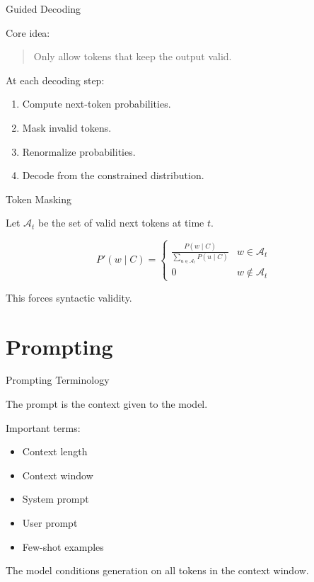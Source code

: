 \documentclass[aspectratio=169]{beamer}
\begin{document}
\begin{frame}{Guided Decoding}

Core idea:

\begin{quote}
Only allow tokens that keep the output valid.
\end{quote}

\vspace{0.4cm}

At each decoding step:

\begin{enumerate}
    \item Compute next-token probabilities.
    \item Mask invalid tokens.
    \item Renormalize probabilities.
    \item Decode from the constrained distribution.
\end{enumerate}

\end{frame}

\begin{frame}{Token Masking}

Let $\mathcal{A}_t$ be the set of valid next tokens at time $t$.

\[
P'(w \mid C)
=
\begin{cases}
\frac{P(w \mid C)}
{\sum_{u \in \mathcal{A}_t}P(u \mid C)}
&
w \in \mathcal{A}_t
\\
0
&
w \notin \mathcal{A}_t
\end{cases}
\]

\vspace{0.4cm}

This forces syntactic validity.

\end{frame}

\section{Prompting}

\begin{frame}{Prompting Terminology}

The prompt is the context given to the model.

\vspace{0.4cm}

Important terms:

\begin{itemize}
    \item Context length
    \item Context window
    \item System prompt
    \item User prompt
    \item Few-shot examples
\end{itemize}

\vspace{0.4cm}

The model conditions generation on all tokens in the context window.

\end{frame}
\end{document}
